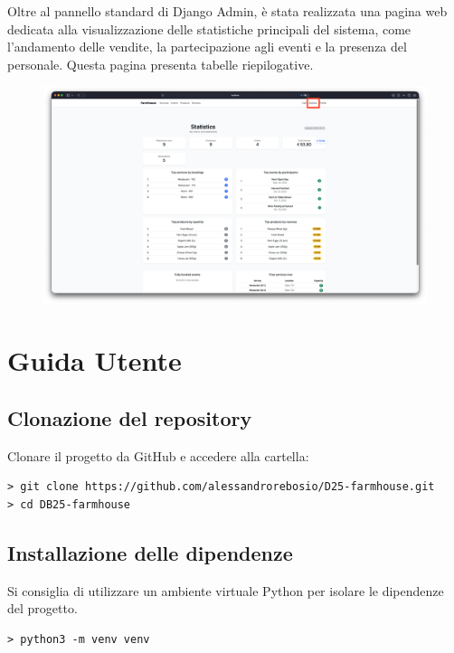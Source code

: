 \documentclass[a4paper,12pt]{report}
\begin{document}
Oltre al pannello standard di Django Admin, è stata realizzata una
pagina web dedicata alla
visualizzazione delle statistiche principali del sistema, come
l'andamento delle vendite, la
partecipazione agli eventi e la presenza del personale. Questa pagina
presenta tabelle
riepilogative.

\begin{figure}[H]
  \centering
  \includegraphics[width=\textwidth, trim=0 0 0 0]{./img/admin/statistic.png}
  \vspace{-1em}
  \label{fig:statistiche}
\end{figure}

\appendix
\chapter{Guida Utente}

\section{Clonazione del repository}
Clonare il progetto da GitHub e accedere alla cartella:

\begin{verbatim}
> git clone https://github.com/alessandrorebosio/D25-farmhouse.git
> cd DB25-farmhouse
\end{verbatim}

\section{Installazione delle dipendenze}

Si consiglia di utilizzare un ambiente virtuale Python per isolare le
dipendenze del progetto.

\begin{verbatim}
> python3 -m venv venv
\end{verbatim}
\end{document}
